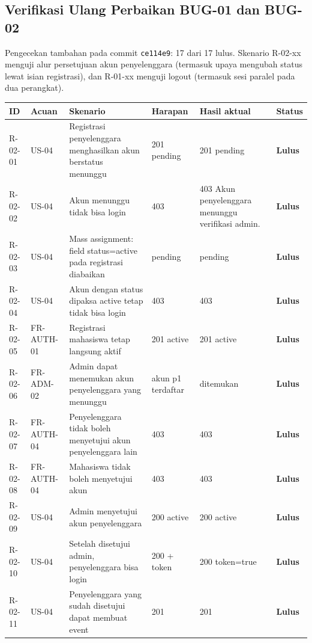 \documentclass[11pt,a4paper]{article}
\renewcommand{\arraystretch}{1.2}
\begin{document}
\subsection{Verifikasi Ulang Perbaikan BUG-01 dan BUG-02}
Pengecekan tambahan pada commit \texttt{ce114e9}: 17 dari 17 lulus. Skenario R-02-xx menguji alur persetujuan akun penyelenggara (termasuk upaya mengubah status lewat isian registrasi), dan R-01-xx menguji logout (termasuk sesi paralel pada dua perangkat).
{\footnotesize\setlength{\parskip}{0pt}\renewcommand{\arraystretch}{1.15}
\begin{longtable}{p{1.8cm}p{1.9cm}p{4.0cm}p{2.4cm}p{3.4cm}p{1.2cm}}
\toprule ID & Acuan & Skenario & Harapan & Hasil aktual & Status\\\midrule\endhead
\mbox{R-02-01} & US-04 & Registrasi penyelenggara menghasilkan akun berstatus menunggu & 201 pending & 201 pending & \textbf{Lulus}\\
\midrule
\mbox{R-02-02} & US-04 & Akun menunggu tidak bisa login & 403 & 403 Akun penyelenggara menunggu verifikasi admin. & \textbf{Lulus}\\
\midrule
\mbox{R-02-03} & US-04 & Mass assignment: field status=active pada registrasi diabaikan & pending & pending & \textbf{Lulus}\\
\midrule
\mbox{R-02-04} & US-04 & Akun dengan status dipaksa active tetap tidak bisa login & 403 & 403 & \textbf{Lulus}\\
\midrule
\mbox{R-02-05} & FR-AUTH-01 & Registrasi mahasiswa tetap langsung aktif & 201 active & 201 active & \textbf{Lulus}\\
\midrule
\mbox{R-02-06} & FR-ADM-02 & Admin dapat menemukan akun penyelenggara yang menunggu & akun p1 terdaftar & ditemukan & \textbf{Lulus}\\
\midrule
\mbox{R-02-07} & FR-AUTH-04 & Penyelenggara tidak boleh menyetujui akun penyelenggara lain & 403 & 403 & \textbf{Lulus}\\
\midrule
\mbox{R-02-08} & FR-AUTH-04 & Mahasiswa tidak boleh menyetujui akun & 403 & 403 & \textbf{Lulus}\\
\midrule
\mbox{R-02-09} & US-04 & Admin menyetujui akun penyelenggara & 200 active & 200 active & \textbf{Lulus}\\
\midrule
\mbox{R-02-10} & US-04 & Setelah disetujui admin, penyelenggara bisa login & 200 + token & 200 token=true & \textbf{Lulus}\\
\midrule
\mbox{R-02-11} & US-04 & Penyelenggara yang sudah disetujui dapat membuat event & 201 & 201 & \textbf{Lulus}\\

\end{longtable}}
\end{document}
